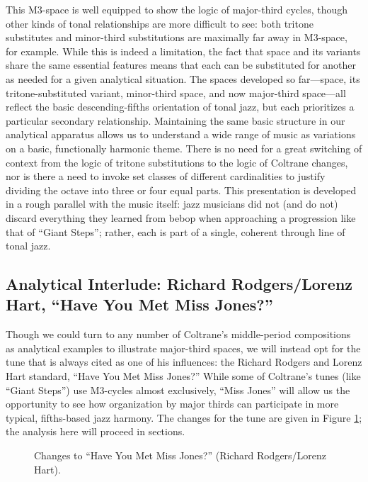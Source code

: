 This M3-space is well equipped to show the logic of major-third cycles, though
other kinds of tonal relationships are more difficult to see: both tritone
substitutes and minor-third substitutions are maximally far away in M3-space,
for example. While this is indeed a limitation, the fact that \tf space and
its variants share the same essential features means that each can be substituted
for another as needed for a given analytical situation. The spaces developed
so far---\tf space, its tritone-substituted variant, minor-third space, and
now major-third space---all reflect the basic descending-fifths orientation
of tonal jazz, but each prioritizes a particular secondary
relationship. Maintaining the same basic structure in our
analytical apparatus allows us to understand a wide range of music as
variations on a basic, functionally harmonic theme. There is no need for a
great switching of context from the logic of tritone substitutions to the logic
of Coltrane changes, nor is there a need to invoke set classes of different
cardinalities to justify dividing the octave into three or four equal parts.
This presentation is developed in a rough parallel with the music itself: jazz
musicians did not (and do not) discard everything they learned from bebop when
approaching a progression like that of ``Giant Steps''; rather, each is part
of a single, coherent through line of tonal jazz.

\subsection{Analytical Interlude: Richard Rodgers/Lorenz Hart, “Have You Met
  Miss Jones?”}
\label{subsec:miss-jones}

Though we could turn to any number of Coltrane's middle-period compositions as
analytical examples to illustrate major-third spaces, we will instead opt for
the tune that is always cited as one of his influences: the Richard Rodgers
and Lorenz Hart standard, ``Have You Met Miss Jones?'' While some of
Coltrane's tunes (like ``Giant Steps'') use M3-cycles almost exclusively,
``Miss Jones'' will allow us the opportunity to see how organization by major
thirds can participate in more typical, fifths-based jazz harmony. The changes
for the tune are given in Figure \ref{maj3:miss-jones-changes}; the analysis
here will proceed in sections.

\begin{figure}[tbp]
  \caption{Changes to ``Have You Met Miss Jones?'' (Richard Rodgers/Lorenz Hart).}
\label{maj3:miss-jones-changes}
\end{figure}

